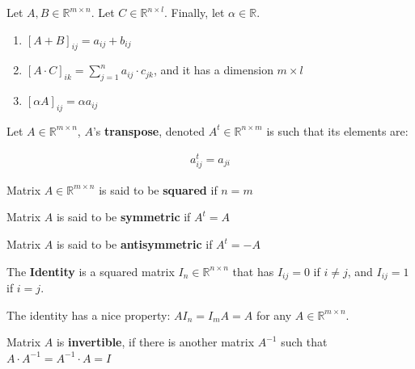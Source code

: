 \documentclass[aspectratio=169]{beamer}
\begin{document}
\begin{frame}
    Let $A,B\in\mathbb{R}^{m\times n}$. Let $C\in\mathbb{R}^{n\times l}$. Finally, let $\alpha\in\mathbb{R}$.
    \begin{enumerate}
        \item $[A+B]_{ij} = a_{ij}+b_{ij}$
        \item $[A \cdot C]_{ik}=\sum_{j=1}^n a_{ij}\cdot c_{jk}$, and it has a dimension $m\times l$
        \item $[\alpha A]_{ij}=\alpha a_{ij}$
    \end{enumerate}
\end{frame}

\begin{frame}
    \begin{definition}
        Let $A\in\mathbb{R}^{m\times n}$, $A$'s \textbf{transpose}, denoted $A^t\in\mathbb{R}^{n\times m}$ is such that its elements are:
        
        \begin{align*}
            a^t_{ij}=a_{ji}
        \end{align*}
    \end{definition}
    
    \begin{definition}
        Matrix $A\in\mathbb{R}^{m\times n}$ is said to be \textbf{squared} if $n=m$
    \end{definition}
    
    \begin{definition}
        Matrix $A$ is said to be \textbf{symmetric} if $A^t=A$
    \end{definition}
    \begin{definition}
        Matrix $A$ is said to be \textbf{antisymmetric} if $A^t=-A$
    \end{definition}
\end{frame}

\begin{frame}
    \begin{definition}
        The \textbf{Identity} is a squared matrix $I_n\in\mathbb{R}^{n\times n}$ that has $I_{ij}=0$ if $i\neq j$, and $I_{ij}=1$ if $i=j$.
    \end{definition}
    
    The identity has a nice property: $A I_n = I_m A= A$ for any $A\in\mathbb{R}^{m\times n}$.
    
    \begin{definition}
        Matrix $A$ is \textbf{invertible}, if there is another matrix $A^{-1}$ such that $A\cdot A^{-1} = A^{-1}\cdot A = I$
    \end{definition}
\end{frame}
\end{document}
